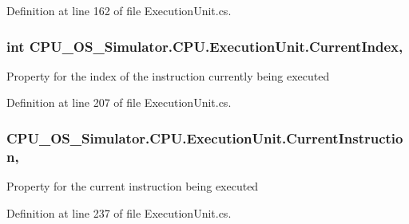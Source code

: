 Definition at line 162 of file Execution\+Unit.\+cs.

\hypertarget{class_c_p_u___o_s___simulator_1_1_c_p_u_1_1_execution_unit_a14d2a23bdc679ed2758733f34f79db63}{}
\subsubsection[{Current\+Index}]{\setlength{\rightskip}{0pt plus 5cm}int C\+P\+U\+\_\+\+O\+S\+\_\+\+Simulator.\+C\+P\+U.\+Execution\+Unit.\+Current\+Index\hspace{0.3cm}{\ttfamily [get]}, {\ttfamily [set]}}\label{class_c_p_u___o_s___simulator_1_1_c_p_u_1_1_execution_unit_a14d2a23bdc679ed2758733f34f79db63}


Property for the index of the instruction currently being executed 



Definition at line 207 of file Execution\+Unit.\+cs.

\hypertarget{class_c_p_u___o_s___simulator_1_1_c_p_u_1_1_execution_unit_a285d7b487a3ac5eff07c640e438ceb11}{}
\subsubsection[{Current\+Instruction}]{ C\+P\+U\+\_\+\+O\+S\+\_\+\+Simulator.\+C\+P\+U.\+Execution\+Unit.\+Current\+Instruction\hspace{0.3cm}{\ttfamily [get]}, {\ttfamily [set]}}\label{class_c_p_u___o_s___simulator_1_1_c_p_u_1_1_execution_unit_a285d7b487a3ac5eff07c640e438ceb11}


Property for the current instruction being executed 



Definition at line 237 of file Execution\+Unit.\+cs.

